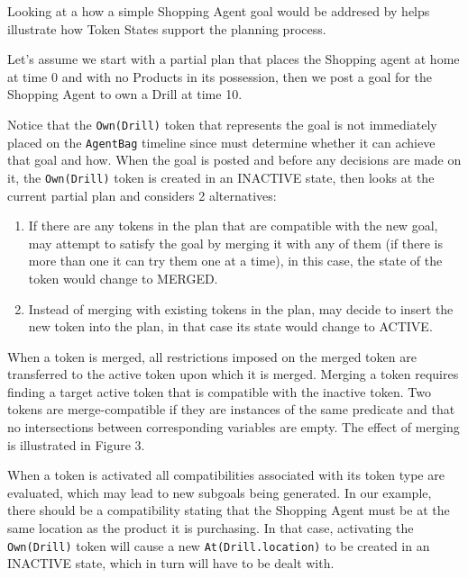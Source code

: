 \begin{description}
Looking at a how a simple Shopping Agent goal would be addresed by \eu helps illustrate how Token States support the planning process.

Let's assume we start with a partial plan that places the Shopping agent at home at time 0 and with no Products in its possession, then we post a goal for the Shopping Agent to own a Drill at time 10.


Notice that the \texttt{Own(Drill)} token that represents the goal is not immediately placed on the \texttt{AgentBag} timeline since \eu must determine whether it can achieve that goal and how. When the goal is posted and before any decisions are made on it, the  \texttt{Own(Drill)} token is created in an INACTIVE state, then \eu looks at the current partial plan and considers 2 alternatives:

\begin{enumerate}
    \item If there are any tokens in the plan that are compatible with the new goal, \eu may attempt to satisfy the goal by merging it with any of them (if there is more than one it can try them one at a time), in this case, the state of the token would change to MERGED.
    \item Instead of merging with existing tokens in the plan, \eu may decide to insert the new token into the plan, in that case its state would change to ACTIVE.
\end{enumerate}

When a token is merged, all restrictions imposed
on the merged token are transferred to the active token upon which it is merged. Merging a
token requires finding a target active token that is compatible with
the inactive token. Two tokens are merge-compatible if they are instances of the same predicate and
that no intersections between corresponding variables are empty. The
effect of merging is illustrated in Figure 3.


When a token is activated all compatibilities associated with its token type are evaluated, which may lead to new subgoals being generated. In our example, there should be a compatibility stating that the Shopping Agent must be at the same location as the product it is purchasing. In that case, activating the \texttt{Own(Drill)} token will cause a new  \texttt{At(Drill.location)} to be created in an INACTIVE state, which in turn will have to be dealt with.


\end{description}
